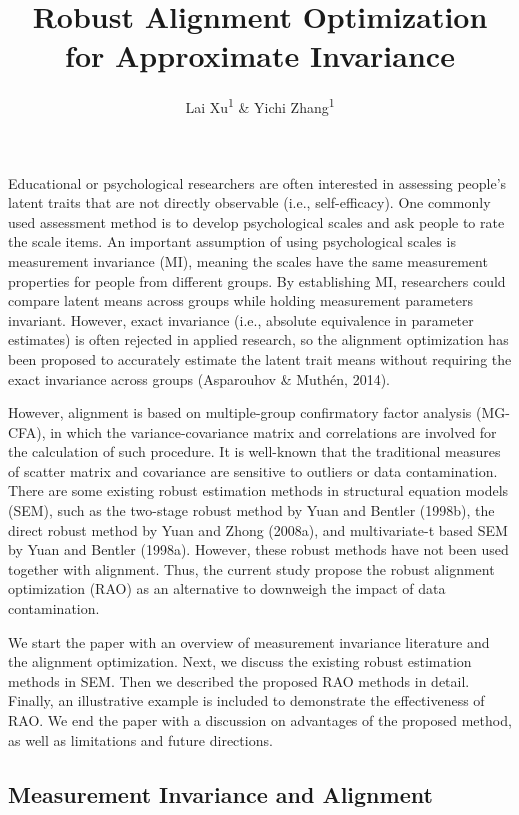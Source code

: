 \documentclass[
  man]{apa7}
\title{Robust Alignment Optimization for Approximate Invariance}
\author{Lai Xu\textsuperscript{1} \& Yichi Zhang\textsuperscript{1}}
\date{}
\affiliation{\vspace{0.5cm}\textsuperscript{1} University of Southern California}
\begin{document}
\maketitle

Educational or psychological researchers are often interested in assessing people's latent traits that are not directly observable (i.e., self-efficacy). One commonly used assessment method is to develop psychological scales and ask people to rate the scale items. An important assumption of using psychological scales is measurement invariance (MI), meaning the scales have the same measurement properties for people from different groups. By establishing MI, researchers could compare latent means across groups while holding measurement parameters invariant. However, exact invariance (i.e., absolute equivalence in parameter estimates) is often rejected in applied research, so the alignment optimization has been proposed to accurately estimate the latent trait means without requiring the exact invariance across groups (Asparouhov \& Muthén, 2014).

However, alignment is based on multiple-group confirmatory factor analysis (MG-CFA), in which the variance-covariance matrix and correlations are involved for the calculation of such procedure. It is well-known that the traditional measures of scatter matrix and covariance are sensitive to outliers or data contamination. There are some existing robust estimation methods in structural equation models (SEM), such as the two-stage robust method by Yuan and Bentler (1998b), the direct robust method by Yuan and Zhong (2008a), and multivariate-t based SEM by Yuan and Bentler (1998a). However, these robust methods have not been used together with alignment. Thus, the current study propose the robust alignment optimization (RAO) as an alternative to downweigh the impact of data contamination.

We start the paper with an overview of measurement invariance literature and the alignment optimization. Next, we discuss the existing robust estimation methods in SEM. Then we described the proposed RAO methods in detail. Finally, an illustrative example is included to demonstrate the effectiveness of RAO. We end the paper with a discussion on advantages of the proposed method, as well as limitations and future directions.

\subsection{Measurement Invariance and Alignment}\label{measurement-invariance-and-alignment}
\end{document}
